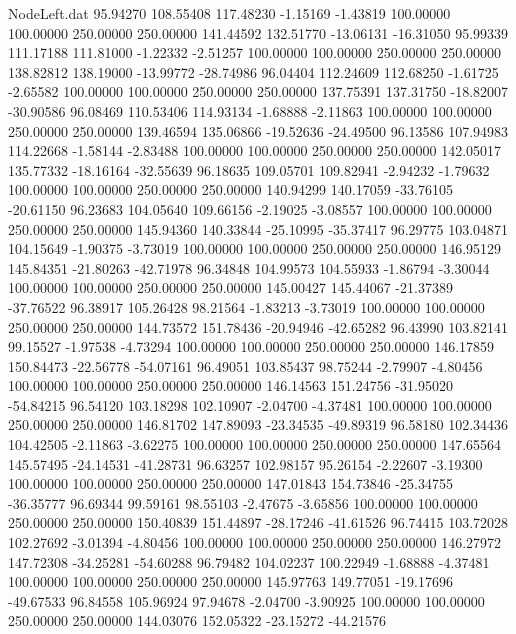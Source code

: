 \begin{filecontents}{NodeLeft.dat}
  95.94270  108.55408  117.48230    -1.15169   -1.43819  100.00000  100.00000  250.00000  250.00000  141.44592  132.51770  -13.06131  -16.31050
  95.99339  111.17188  111.81000    -1.22332   -2.51257  100.00000  100.00000  250.00000  250.00000  138.82812  138.19000  -13.99772  -28.74986
  96.04404  112.24609  112.68250    -1.61725   -2.65582  100.00000  100.00000  250.00000  250.00000  137.75391  137.31750  -18.82007  -30.90586
  96.08469  110.53406  114.93134    -1.68888   -2.11863  100.00000  100.00000  250.00000  250.00000  139.46594  135.06866  -19.52636  -24.49500
  96.13586  107.94983  114.22668    -1.58144   -2.83488  100.00000  100.00000  250.00000  250.00000  142.05017  135.77332  -18.16164  -32.55639
  96.18635  109.05701  109.82941    -2.94232   -1.79632  100.00000  100.00000  250.00000  250.00000  140.94299  140.17059  -33.76105  -20.61150
  96.23683  104.05640  109.66156    -2.19025   -3.08557  100.00000  100.00000  250.00000  250.00000  145.94360  140.33844  -25.10995  -35.37417
  96.29775  103.04871  104.15649    -1.90375   -3.73019  100.00000  100.00000  250.00000  250.00000  146.95129  145.84351  -21.80263  -42.71978
  96.34848  104.99573  104.55933    -1.86794   -3.30044  100.00000  100.00000  250.00000  250.00000  145.00427  145.44067  -21.37389  -37.76522
  96.38917  105.26428   98.21564    -1.83213   -3.73019  100.00000  100.00000  250.00000  250.00000  144.73572  151.78436  -20.94946  -42.65282
  96.43990  103.82141   99.15527    -1.97538   -4.73294  100.00000  100.00000  250.00000  250.00000  146.17859  150.84473  -22.56778  -54.07161
  96.49051  103.85437   98.75244    -2.79907   -4.80456  100.00000  100.00000  250.00000  250.00000  146.14563  151.24756  -31.95020  -54.84215
  96.54120  103.18298  102.10907    -2.04700   -4.37481  100.00000  100.00000  250.00000  250.00000  146.81702  147.89093  -23.34535  -49.89319
  96.58180  102.34436  104.42505    -2.11863   -3.62275  100.00000  100.00000  250.00000  250.00000  147.65564  145.57495  -24.14531  -41.28731
  96.63257  102.98157   95.26154    -2.22607   -3.19300  100.00000  100.00000  250.00000  250.00000  147.01843  154.73846  -25.34755  -36.35777
  96.69344   99.59161   98.55103    -2.47675   -3.65856  100.00000  100.00000  250.00000  250.00000  150.40839  151.44897  -28.17246  -41.61526
  96.74415  103.72028  102.27692    -3.01394   -4.80456  100.00000  100.00000  250.00000  250.00000  146.27972  147.72308  -34.25281  -54.60288
  96.79482  104.02237  100.22949    -1.68888   -4.37481  100.00000  100.00000  250.00000  250.00000  145.97763  149.77051  -19.17696  -49.67533
  96.84558  105.96924   97.94678    -2.04700   -3.90925  100.00000  100.00000  250.00000  250.00000  144.03076  152.05322  -23.15272  -44.21576

\end{filecontents}
